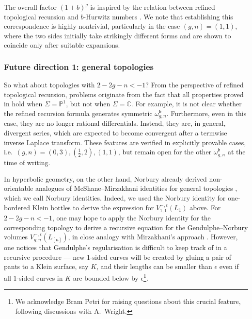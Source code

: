 \documentclass[12pt]{amsart}
\theoremstyle{plain}
\theoremstyle{definition}
\theoremstyle{remark}
\numberwithin{equation}{section}
\begin{document}
The overall factor $(1+b)^g$ is inspired by the relation between refined topological recursion and $b$-Hurwitz numbers \cite{CDO24-1,CDO24-2}. We note that establishing this correspondence is highly nontrivial, particularly in the case $(g,n)=(1,1)$, where the two sides initially take strikingly different forms and are shown to coincide only after suitable expansions.







\subsubsection{Future direction 1: general topologies}

So what about topologies with $2-2g-n<-1$? From the perspective of refined topological recursion, problems originate from the fact that all properties proved in \cite{KO22,Osu23-1} hold when $\Sigma=\mathbb{P}^1$, but not when $\Sigma=\mathbb{C}$. For example, it is not clear whether the refined recursion formula generates symmetric $\omega_{g,n}^\mathfrak{b}$. Furthermore, even in this case, they are no longer rational differentials. Instead, they are, in general, divergent series, which are expected to become convergent after a termwise inverse Laplace transform. These features are verified  in explicitly provable cases, i.e.~$(g,n)=(0,3),(\frac12,2),(1,1)$, but remain open for the other $\omega_{g,n}^\mathfrak{b}$ at the time of writing. 

In hyperbolic geometry, on the other hand, Norbury already derived non-orientable analogues of McShane--Mirzakhani identities for general topologies \cite{Nor07}, which we call Norbury identities. Indeed, we used the Norbury identity for one-bordered Klein bottles to derive the expression for $V_{1,1}^{-,\epsilon}(L_1)$ above. For $2-2g-n<-1$, one may hope to apply the Norbury identity for the corresponding topology to derive a recursive equation for the Gendulphe--Norbury volumes $V_{g,n}^{-,\epsilon}(L_{[n]})$, in close analogy with Mirzakhani's approach \cite{Mir06}. However, one notices that Gendulphe's regularisation is difficult to keep track of in a recursive procedure --- new 1-sided curves will be created by gluing a pair of pants to a Klein surface, say $K$, and their lengths can be smaller than $\epsilon$ even if all 1-sided curves in $K$ are bounded below by $\epsilon$\footnote{We acknowledge Bram Petri for raising questions about this crucial feature, following discussions with A.~Wright.}. 
\end{document}
